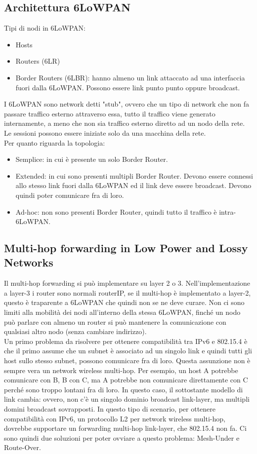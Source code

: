 \documentclass{article}
\begin{document}
\subsection{Architettura 6LoWPAN}
Tipi di nodi in 6LoWPAN:
\begin{itemize}
    \item Hosts 
    \item Routers (6LR)
    \item Border Routers (6LBR): hanno almeno un link attaccato ad una interfaccia fuori dalla 6LoWPAN. Possono essere link punto punto oppure broadcast.
\end{itemize}
I 6LoWPAN sono network detti "stub", ovvero che un tipo di network che non fa passare traffico esterno attraverso essa, tutto il traffico viene generato internamente, a meno che non sia traffico esterno diretto ad un nodo della rete. Le sessioni possono essere iniziate solo da una macchina della rete. \\ Per quanto riguarda la topologia:
\begin{itemize}
    \item Semplice: in cui è presente un solo Border Router.
    \item Extended: in cui sono presenti multipli Border Router. Devono essere connessi allo stesso link fuori dalla 6LoWPAN ed il link deve essere broadcast. Devono quindi poter comunicare fra di loro.
    \item Ad-hoc: non sono presenti Border Router, quindi tutto il traffico è intra-6LoWPAN.
\end{itemize}

\subsection{Multi-hop forwarding in Low Power and Lossy Networks}
Il multi-hop forwarding si può implementare su layer 2 o 3. Nell'implementazione a layer-3 i router sono normali routerIP, se il multi-hop è implementato a layer-2, questo è traparente a 6LoWPAN che quindi non se ne deve curare. Non ci sono limiti alla mobilità dei nodi all'interno della stessa 6LoWPAN, finché un nodo può parlare con almeno un router si può mantenere la comunicazione con qualsiasi altro nodo (senza cambiare indirizzo). \\ Un primo problema da risolvere per ottenere compatibilità tra IPv6 e 802.15.4 è che il primo assume che un subnet è associato ad un singolo link e quindi tutti gli host sullo stesso subnet, possono comunicare fra di loro. Questa assunzione non è sempre vera un network wireless multi-hop. Per esempio, un host A potrebbe comunicare con B, B con C, ma A potrebbe non comunicare direttamente con C perché sono troppo lontani fra di loro. In questo caso, il sottostante modello di link cambia: ovvero, non c'è un singolo dominio broadcast link-layer, ma multipli domini broadcast sovrapposti. In questo tipo di scenario, per ottenere compatibilità con IPv6, un protocollo L2 per network wireless multi-hop, dovrebbe supportare un forwarding multi-hop link-layer, che 802.15.4 non fa. Ci sono quindi due soluzioni per poter ovviare a questo problema: Mesh-Under e Route-Over.
\end{document}
